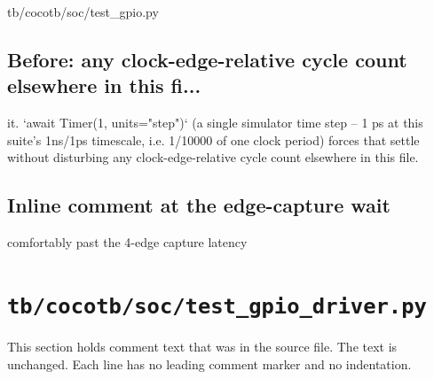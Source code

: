 \begin{relocated}{tb/cocotb/soc/test_gpio.py}
\subsection*{Before: any clock-edge-relative cycle count elsewhere in this fi...}

\begin{textblock}
it. `await Timer(1, units="step")` (a single simulator time step -- 1 ps at this suite's
1ns/1ps timescale, i.e. 1/10000 of one clock period) forces that settle without disturbing
any clock-edge-relative cycle count elsewhere in this file.
\end{textblock}

\subsection*{Inline comment at the edge-capture wait}

\begin{textblock}
comfortably past the 4-edge capture latency
\end{textblock}

\end{relocated}

\section{\texttt{tb/cocotb/soc/test\_gpio\_driver.py}}\label{tm:suite:soc-test-gpio-driver}

This section holds comment text that was in the source file. The text is unchanged. Each line has no leading comment marker and no indentation.

